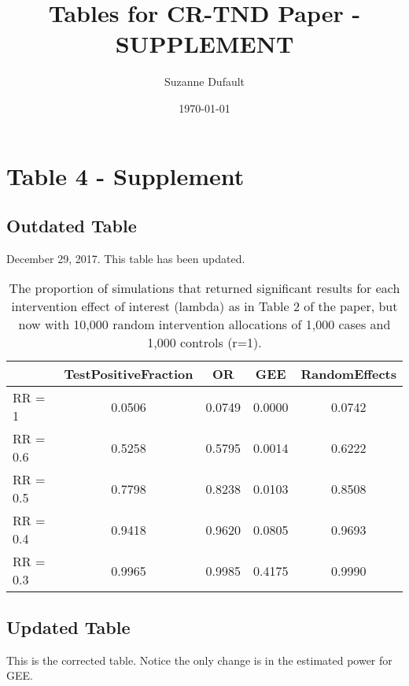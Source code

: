 \documentclass{article}\usepackage[]{graphicx}\usepackage[]{color}
\title{Tables for CR-TND Paper - SUPPLEMENT}
\date{\today}
\author{Suzanne Dufault}
\begin{document}
\maketitle

\section{Table 4 - Supplement}

\subsection{Outdated Table}
December 29, 2017. This table has been updated. \FloatBarrier





\begin{table}[ht]
\centering
\begin{tabular}{l|cccc}
  \hline
 & TestPositiveFraction & OR & GEE & RandomEffects \\ 
  \hline
RR = 1 & 0.0506 & 0.0749 & 0.0000 & 0.0742 \\ 
  RR = 0.6 & 0.5258 & 0.5795 & 0.0014 & 0.6222 \\ 
  RR = 0.5 & 0.7798 & 0.8238 & 0.0103 & 0.8508 \\ 
  RR = 0.4 & 0.9418 & 0.9620 & 0.0805 & 0.9693 \\ 
  RR = 0.3 & 0.9965 & 0.9985 & 0.4175 & 0.9990 \\ 
   \hline
\end{tabular}
\caption{The proportion of simulations that returned significant results for each intervention effect of interest (lambda) as in Table 2 of the paper, but now with 10,000 random intervention allocations of 1,000 cases and 1,000 controls (r=1).} 
\end{table}


\FloatBarrier

\subsection{Updated Table}

\FloatBarrier

This is the corrected table. Notice the only change is in the estimated power for GEE.
\end{document}

